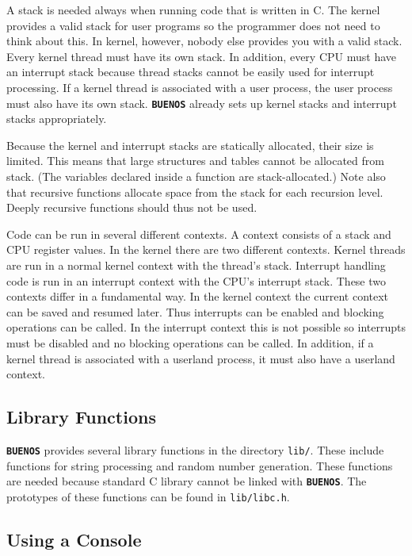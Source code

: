 \documentclass[twoside,a4paper]{report}
\newcommand{\buenos}{\texttt{\textbf{BUENOS}}}
\begin{document}

A stack is needed always when running code that is written in C. The
kernel provides a valid stack for user programs so the programmer does
not need to think about this. In kernel, however, nobody else provides
you with a valid stack. Every kernel thread must have its own stack.
In addition, every CPU must have an interrupt stack because thread
stacks cannot be easily used for interrupt processing. If a kernel
thread is associated with a user process, the user process must also
have its own stack. \buenos{} already sets up kernel stacks and
interrupt stacks appropriately.

Because the kernel and interrupt stacks are statically allocated,
their size is limited. This means that large structures and tables
cannot be allocated from stack. (The variables declared inside a
function are stack-allocated.) Note also that recursive functions
allocate space from the stack for each recursion level. Deeply
recursive functions should thus not be used.


Code can be run in several different contexts. A context consists of a
stack and CPU register values. In the kernel there are two different
contexts. Kernel threads are run in a normal kernel context with the
thread's stack. Interrupt handling code is run in an interrupt context
with the CPU's interrupt stack. These two contexts differ in a
fundamental way. In the kernel context the current context can be
saved and resumed later. Thus interrupts can be enabled and blocking
operations can be called. In the interrupt context this is not
possible so interrupts must be disabled and no blocking operations can
be called. In addition, if a kernel thread is associated with a
userland process, it must also have a userland context.

\subsection{Library Functions}

\buenos{} provides several library functions in the directory
\texttt{lib/}. These include functions for string processing and
random number generation. These functions are needed because standard
C library cannot be linked with \buenos{}. The prototypes of these
functions can be found in \texttt{lib/libc.h}.

\subsection{Using a Console}
\end{document}
